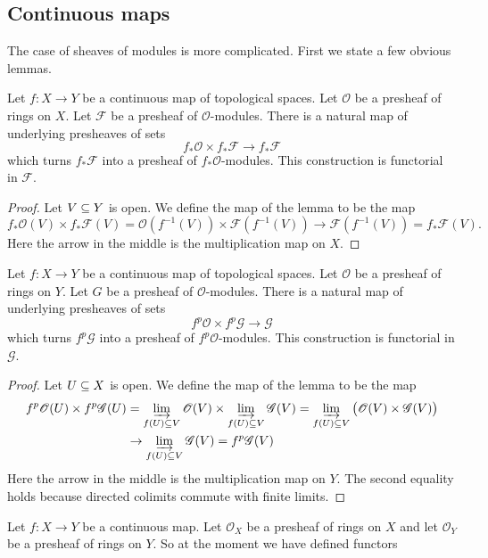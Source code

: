 \subsection{Continuous maps}
The case of sheaves of modules is more complicated. First we state a few obvious lemmas.
\begin{lemma}\label{push presheaf module def}
Let $f:X\to Y$ be a continuous map of topological spaces. Let $\mathscr{O}$ be a presheaf of rings on $X$. Let $\mathscr{F}$ be a presheaf of $\mathscr{O}$-modules. There is a natural map of underlying presheaves of sets
\[f_*\mathscr{O}\times f_*\mathscr{F}\to f_*\mathscr{F}\]
which turns $f_*\mathscr{F}$ into a presheaf of $f_*\mathscr{O}$-modules. This construction is functorial in $\mathscr{F}$.
\end{lemma}
\begin{proof}
Let $V\subseteq Y$ is open. We define the map of the lemma to be the map
\[f_*\mathscr{O}(V)\times f_*\mathscr{F}(V)=\mathscr{O}(f^{-1}(V))\times\mathscr{F}(f^{-1}(V))\to\mathscr{F}(f^{-1}(V))=f_*\mathscr{F}(V).\]
Here the arrow in the middle is the multiplication map on $X$.
\end{proof}
\begin{lemma}\label{pull back presheaf module def}
Let $f:X\to Y$ be a continuous map of topological spaces. Let $\mathscr{O}$ be a presheaf of rings on $Y$. Let $G$ be a presheaf of $\mathscr{O}$-modules. There is a natural map of underlying presheaves of sets
\[f^p\mathscr{O}\times f^p\mathscr{G}\to\mathscr{G}\]
which turns $f^p\mathscr{G}$ into a presheaf of $f^p\mathscr{O}$-modules. This construction is functorial in $\mathscr{G}$.
\end{lemma}
\begin{proof}
Let $U\subseteq X$ is open. We define the map of the lemma to be the map
\begin{align*}
f^p\mathscr{O}(U)\times f^p\mathscr{G}(U)&=\varinjlim\limits_{f(U)\subseteq V}\mathscr{O}(V)\times\varinjlim\limits_{f(U)\subseteq V}\mathscr{G}(V)=\varinjlim\limits_{f(U)\subseteq V}\big(\mathscr{O}(V)\times\mathscr{G}(V)\big)\\
&\to\varinjlim\limits_{f(U)\subseteq V}\mathscr{G}(V)=f^p\mathscr{G}(V)
\end{align*}
Here the arrow in the middle is the multiplication map on $Y$. The second equality holds because directed colimits commute with finite limits.
\end{proof}
Let $f:X\to Y$ be a continuous map. Let $\mathscr{O}_X$ be a presheaf of rings on $X$ and let $\mathscr{O}_Y$ be a presheaf of rings on $Y$. So at the moment we have defined functors
